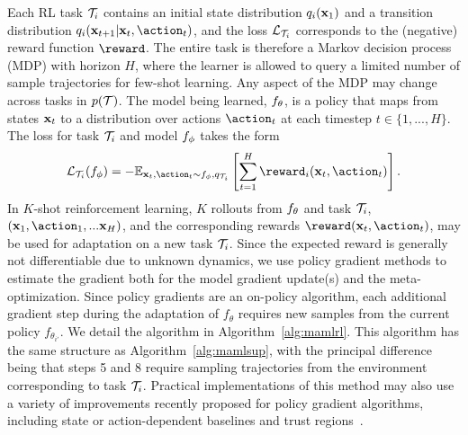 \documentclass{article}
\begin{document}
Each RL task $\mathcal{T}_i$ contains an initial state distribution $q_i(\mathbf{x}_1)$ and a transition distribution $q_i(\inp_{t+1}|\inp_t,\action_t)$, and the loss $\mathcal{L}_{\mathcal{T}_i}$ corresponds to the (negative) reward function $\reward$. The entire task is therefore a Markov decision process (MDP) with horizon $H$, where the learner is allowed to query a limited number of sample trajectories for few-shot learning. Any aspect of the MDP may change across tasks in $p(\mathcal{T})$. The model being learned, $f_\theta$, is a policy that maps from states $\mathbf{x}_t$ to a distribution over actions $\action_t$ at each timestep $t \in \{1,...,H\}$. The loss for task $\mathcal{T}_i$ and model $f_\phi$ takes the form
\vspace{-0.1cm}
\begin{align}
\label{eq:rl}
\lossi( \learner_\phi) = - \mathbb{E}_{\inp_t, \action_t \sim \learner_\phi, q_{\task_i}}\left[ \sum_{t=1}^H \reward_i(\inp_t, \action_t)  \right].
\end{align}
In $K$-shot reinforcement learning, $K$ rollouts from $f_\theta$ and
task $\mathcal{T}_i$, $(\inp_1,\action_1,...\inp_H)$, and the corresponding rewards $\reward(\inp_t, \action_t)$, may be used for adaptation on a new task $\mathcal{T}_i$. Since the expected reward is generally not differentiable due to unknown dynamics, we use policy gradient methods to estimate the gradient both for the model gradient update(s) and the meta-optimization. Since policy gradients are an on-policy algorithm, each additional gradient step during the adaptation of $f_\theta$ requires new samples from the current policy $f_{\theta_{i'}}$. We detail the algorithm in Algorithm~\ref{alg:mamlrl}. This algorithm has the same structure as Algorithm~\ref{alg:mamlsup}, with the principal difference being that steps 5 and 8 require sampling trajectories from the environment corresponding to task $\mathcal{T}_i$. Practical implementations of this method may also use a variety of improvements recently proposed for policy gradient algorithms, including state or action-dependent baselines and trust regions~\cite{trpo}.
\end{document}
